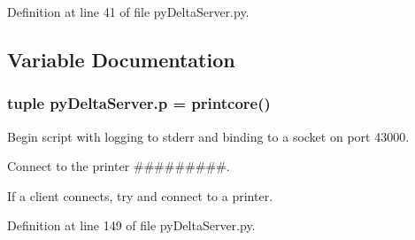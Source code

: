 Definition at line 41 of file py\+Delta\+Server.\+py.



\subsection{Variable Documentation}
\hypertarget{namespacepy_delta_server_a9f57f27f471bef1c4947e6e03b515430}{}
\subsubsection[{p}]{\setlength{\rightskip}{0pt plus 5cm}tuple py\+Delta\+Server.\+p = printcore()}\label{namespacepy_delta_server_a9f57f27f471bef1c4947e6e03b515430}


Begin script with logging to stderr and binding to a socket on port 43000. 

Connect to the printer \#\#\#\#\#\#\#\#\#.

If a client connects, try and connect to a printer. 

Definition at line 149 of file py\+Delta\+Server.\+py.

